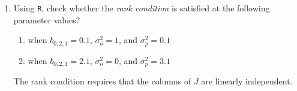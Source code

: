 \begin{enumerate}
    \item Using \texttt{R}, check whether the \emph{rank condition} is satisfied at the following parameter values?

          \begin{enumerate}[label=\roman*.]
              \item when $b_{0, 2, 1} = 0.1$, $\sigma_o^2 = 1$, and $\sigma_p^2 = 0.1$

              \item when $b_{0, 2, 1} = 2.1$, $\sigma_o^2 = 0$, and $\sigma_p^2 = 3.1$
          \end{enumerate}

          \begin{sol}
              \begin{definition}
                  The rank condition requires that the columns of $J$ are linearly independent.
              \end{definition}
              
          \end{sol}
\end{enumerate}